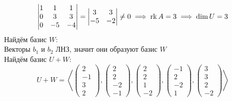 $$
\begin{vmatrix}
	1 & 1 & 1 \\
    0 & 3 & 3 \\
    0 & -5 & -4
\end{vmatrix} =
\begin{vmatrix}
	3 & 3 \\
    -5 & -2
\end{vmatrix} \ne 0 \implies \operatorname{rk} A = 3 \implies \dim U = 3 $$
Найдём базис $ W $: \\
Векторы $ b_1 $ и $ b_2 $ ЛНЗ, значит они образуют базис $ W $ \\
Найдём базис $ U + W $:
$$ U + W = \left\langle
\begin{pmatrix}
	2 \\
    -1 \\
    3 \\
    2
\end{pmatrix},
\begin{pmatrix}
	2 \\
    2 \\
    -2 \\
    -1
\end{pmatrix},
\begin{pmatrix}
	2 \\
    2 \\
    1 \\
    -2
\end{pmatrix},
\begin{pmatrix}
	-1 \\
    2 \\
    -2 \\
    1
\end{pmatrix},
\begin{pmatrix}
	3 \\
    3 \\
    2 \\
    -2
\end{pmatrix} \right\rangle $$
